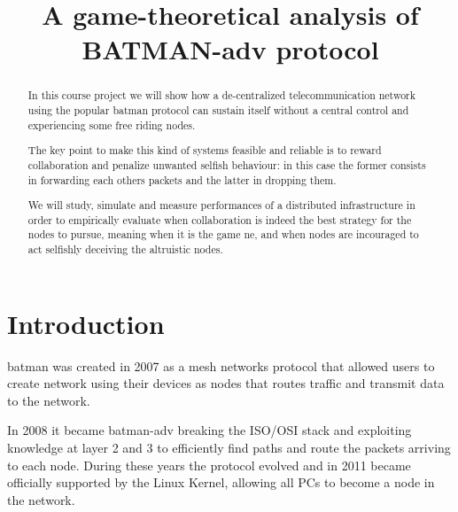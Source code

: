 \documentclass[conference,10.5pt]{IEEEtran}
\begin{document}
\title{A game-theoretical analysis of BATMAN-adv protocol}

\author{
\and
{}
}

\maketitle

\begin{abstract}
  In this course project we will show how a de-centralized telecommunication network using the popular \gls{batman} protocol can sustain itself without a central control and experiencing some free riding nodes.

  The key point to make this kind of systems feasible and reliable is to reward collaboration and penalize unwanted selfish behaviour: in this case the former consists in forwarding each others packets and the latter in dropping them.

  We will study, simulate and measure performances of a distributed infrastructure in order to empirically evaluate when collaboration is indeed the best strategy for the nodes to pursue, meaning when it is the game \gls{ne}, and when nodes are incouraged to act selfishly deceiving the altruistic nodes.
\end{abstract}

\section{Introduction}


\gls{batman} was created in 2007 as a mesh networks protocol that allowed users to create network using their devices as nodes that routes traffic and transmit data to the network.

In 2008 it became \gls{batman}-adv breaking the ISO/OSI stack and exploiting knowledge at layer 2 and 3 to efficiently find paths and route the packets arriving to each node. During these years the protocol evolved and in 2011 became officially supported by the Linux Kernel, allowing all PCs to become a node in the network.
\end{document}
